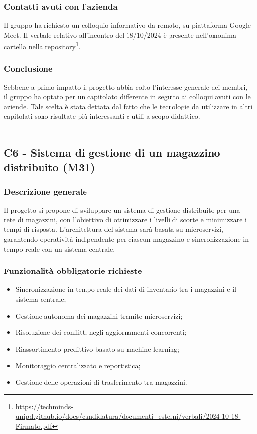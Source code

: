 \documentclass[10pt]{article}
\begin{document}
\subsubsection{Contatti avuti con l'azienda}
Il gruppo ha richiesto un colloquio informativo da remoto, su piattaforma Google Meet. Il verbale relativo all'incontro del 18/10/2024 è presente nell'omonima cartella nella repository\footnote{\url{https://techminds-unipd.github.io/docs/candidatura/documenti_esterni/verbali/2024-10-18-Firmato.pdf}}.
\subsubsection{Conclusione}
Sebbene a primo impatto il progetto abbia colto l'interesse generale dei membri, il gruppo ha optato per un capitolato differente in seguito ai colloqui avuti con le aziende. Tale scelta è stata dettata dal fatto che le tecnologie da utilizzare in altri capitolati sono risultate più interessanti e utili a scopo didattico.
\\\\
\subsection{C6 - Sistema di gestione di un magazzino distribuito (M31)}
\subsubsection{Descrizione generale}
Il progetto si propone di sviluppare un sistema di gestione distribuito per una rete di magazzini, con l'obiettivo di ottimizzare i livelli di scorte e minimizzare i tempi di risposta. L'architettura del sistema sarà basata su microservizi, garantendo operatività indipendente per ciascun magazzino e sincronizzazione in tempo reale con un sistema centrale.
\subsubsection{Funzionalità obbligatorie richieste}
\begin{itemize}
    \item Sincronizzazione in tempo reale dei dati di inventario tra i magazzini e il sistema centrale;
    \item Gestione autonoma dei magazzini tramite microservizi;
    \item Risoluzione dei conflitti negli aggiornamenti concorrenti;
    \item Riassortimento predittivo basato su machine learning;
    \item Monitoraggio centralizzato e reportistica;
    \item Gestione delle operazioni di trasferimento tra magazzini.
\end{itemize}
\end{document}
